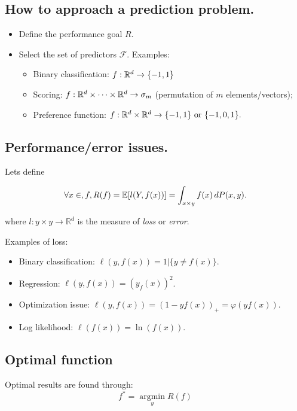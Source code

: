 		\subsection{How to approach a prediction problem.}
			\begin{itemize}
				\item Define the performance goal $R$. 
				\item Select the set of predictors $\mathcal{F}$. Examples: 
					\begin{itemize}
							\item Binary classification: $\mathnormal{f}:\mathbb{R}^d\rightarrow\{-1,1\}$
							\item Scoring: $\mathnormal{f}:\mathbb{R}^d \times \dots \times \mathbb{R}^d \rightarrow {\sigma}_m $ (permutation  of $m$ elements/vectors);
							\item Preference function: $\mathnormal{f}:\mathbb{R}^d \times \mathbb{R}^d \rightarrow \{-1,1\} \mbox{ or } \{-1,0,1\}.$
					\end{itemize}
			\end{itemize}

		\subsection{Performance/error issues.}

			Lets define

			\[ \forall x \in, \mathnormal{f}, R(f)=\mathbb{E}[l(Y,f(x))] =  \int_{x{\times}y} f(x)\,dP(x,y).\] 

			where $l:y{\times}y \rightarrow \mathbb{R}^d$ is the measure of \emph{loss} or \emph{error}.
			
			Examples of loss:
					\begin{itemize}
							\item Binary classification: $\ell(y,f(x)) = 1|\{y \neq f(x)\}$.
							\item Regression: $\ell(y,f(x))=(y_f(x))^2$.
							\item Optimization issue: $\ell(y,f(x))=(1-yf(x))_+ = \varphi(yf(x))$.
							\item Log likelihood: $\ell(f(x))=\ln(f(x))$.
					\end{itemize}

		\subsection{Optimal function}
			Optimal results are found through:
			\[
				f^*=\underset{y}{\operatorname{argmin}}R(f) 
			\]

